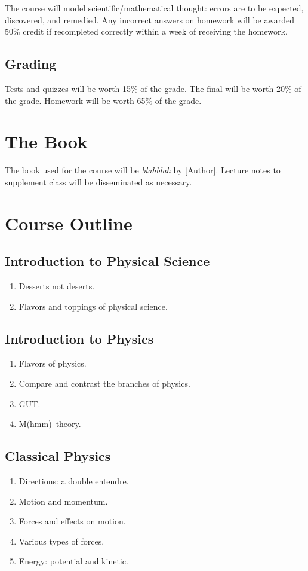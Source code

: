 \documentclass[11pt,article,oneside]{memoir}
\begin{document}
The course will model scientific/mathematical thought: errors are to be expected, discovered, and remedied. Any incorrect answers
on homework will be awarded 50\% credit if recompleted correctly within a week of receiving the homework.
\subsection*{Grading}
	Tests and quizzes will be worth 15\% of the grade. The final will be worth 20\% of the grade. Homework will be worth 65\% of the grade.




\section*{The Book}
The book used for the course will be \textit{blahblah} by [Author]. Lecture notes to supplement class will be disseminated
as necessary.


\section*{Course Outline}
\subsection*{Introduction to Physical Science}
\begin{enumerate}
\item Desserts not deserts.
\item Flavors and toppings of physical science.
\end{enumerate}
\subsection*{Introduction to Physics}
\begin{enumerate}
\item Flavors of physics.
\item Compare and contrast the branches of physics.
\item GUT.
\item M(hmm)--theory.
\end{enumerate}
\subsection*{Classical Physics}
\begin{enumerate}
\item Directions: a double entendre.
\item Motion and momentum.
\item Forces and effects on motion.
\item Various types of forces.
\item Energy: potential and kinetic.
\end{enumerate}
\end{document}
